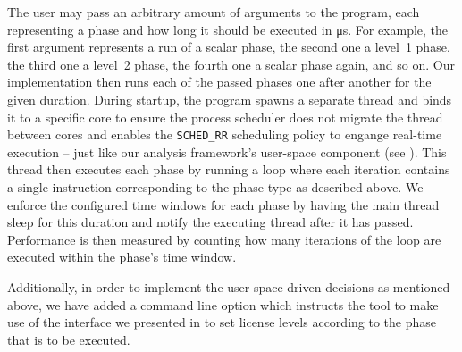 The user may pass an arbitrary amount of arguments to the program, each representing a phase and how long it should be executed in \si{\micro\second}. For example, the first argument represents a run of a scalar phase, the second one a level~1 phase, the third one a level~2 phase, the fourth one a scalar phase again, and so on. Our implementation then runs each of the passed phases one after another for the given duration. During startup, the program spawns a separate thread and binds it to a specific core to ensure the process scheduler does not migrate the thread between cores and enables the \texttt{SCHED\_RR} scheduling policy to engange real-time execution -- just like our analysis framework's user-space component (see ). This thread then executes each phase by running a loop where each iteration contains a single instruction corresponding to the phase type as described above. We enforce the configured time windows for each phase by having the main thread sleep for this duration and notify the executing thread after it has passed. Performance is then measured by counting how many iterations of the loop are executed within the phase's time window.

Additionally, in order to implement the user-space-driven decisions as mentioned above, we have added a command line option which instructs the tool to make use of the interface we presented in  to set license levels according to the phase that is to be executed.

